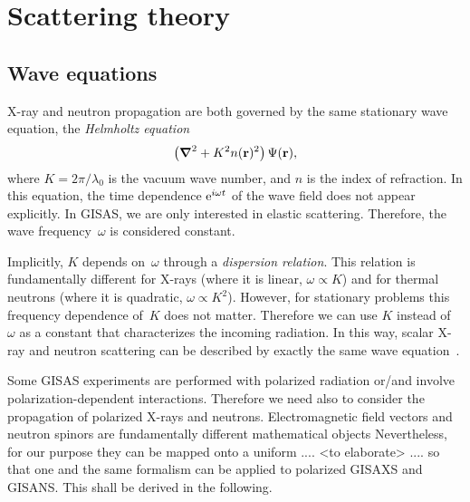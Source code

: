 

\chapter{Scattering theory}  


\section{Wave equations}

X-ray and neutron propagation are both governed by
the same stationary wave equation,
the \textit{Helmholtz equation}
\begin{equation}\label{eq:Helmholtz}
  \left(\text{\boldmath$\nabla$}^2+K^2n(\mathbf{r})^2\right)\Psi(\mathbf{r}),
\end{equation}
where $K=2\pi/\lambda_0$ is the vacuum wave number,
and $n$ is the index of refraction.
In this equation,
the time dependence ${\rm e}^{i\omega t}$ of the wave field
does not appear explicitly.
In GISAS, we are only interested in elastic scattering.
Therefore, the wave frequency~$\omega$ is considered constant.

Implicitly, $K$ depends on~$\omega$ through a \textit{dispersion relation}.
This relation is fundamentally different for
X-rays (where it is linear, $\omega\propto K$)
and for thermal neutrons (where it is quadratic, $\omega\propto K^2$).
However, for stationary problems
this frequency dependence of~$K$ does not matter.
Therefore we can use $K$ instead of~$\omega$ as a constant
that characterizes the incoming radiation.
In this way, scalar X-ray and neutron scattering can be described by exactly
the same wave equation~.

Some GISAS experiments are performed with polarized radiation
or/and involve polarization-dependent interactions.
Therefore we need also to consider
the propagation of polarized X-rays and neutrons.
Electromagnetic field vectors and neutron spinors
are fundamentally different mathematical objects
Nevertheless, for our purpose they can be
mapped onto a uniform .... <to elaborate> ....
so that one and the same formalism can be applied
to polarized GISAXS and GISANS.
This shall be derived in the following.

